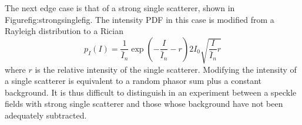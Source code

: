 The next edge case is that of a strong single scatterer, shown in 
Figure{fig:strongsinglefig}.  The intensity PDF in this case is modified
from a Rayleigh distribution to a Rician~\cite{goodman2007speckle} 
\begin{equation}
p_I(I) = \frac{1}{\bar{I}_n} \exp\left(-\frac{I}{\bar{I}_n} - r\right) 2 I_0
\sqrt{\frac{I}{\bar{I}_n} r}
\label{ricedpf}
\end{equation}
where $r$ is the relative intensity of the single scatterer.  Modifying the
intensity of a single scatterer is equivalent to a random phasor sum plus a
constant background.  It is thus difficult to distinguish in an experiment
between a speckle fields with strong single scatterer and those whose
background have not been adequately subtracted.
